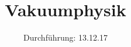 

\subject{V 70}
\title{Vakuumphysik}
\date{
  Durchführung: 13.12.17
  \hspace{3em}
}



\maketitle
\thispagestyle{empty}
\tableofcontents
\newpage
\setcounter{page}{1}





\printbibliography


